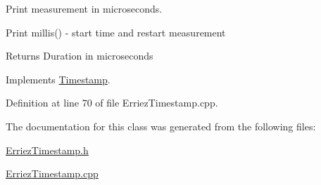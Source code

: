 Print measurement in microseconds. 

Print millis() -\/ start time and restart measurement \begin{DoxyReturn}{Returns}
Duration in microseconds 
\end{DoxyReturn}


Implements \hyperlink{class_timestamp_a62b55270dae36ad337c87ae30eeb2fb9}{Timestamp}.



Definition at line 70 of file Erriez\+Timestamp.\+cpp.



The documentation for this class was generated from the following files\+:\begin{DoxyCompactItemize}
\item 
\hyperlink{_erriez_timestamp_8h}{Erriez\+Timestamp.\+h}\item 
\hyperlink{_erriez_timestamp_8cpp}{Erriez\+Timestamp.\+cpp}\end{DoxyCompactItemize}
